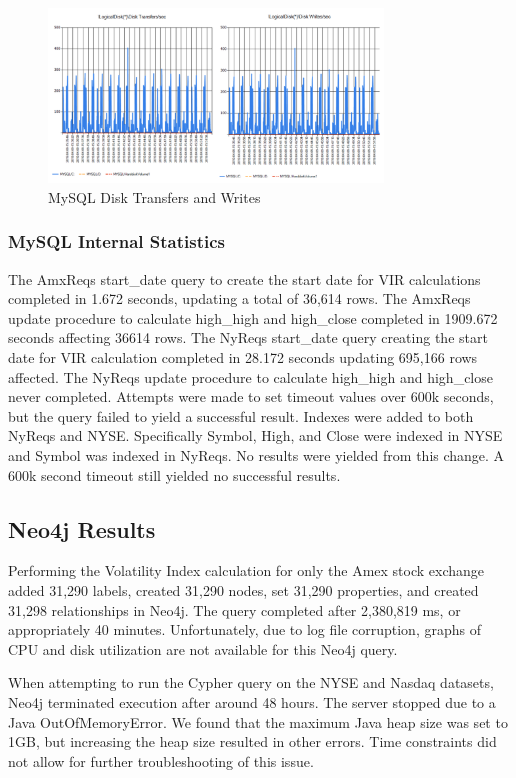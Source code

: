 \documentclass{IEEEtran}
\begin{document}
\begin{figure}
	\centering
	\includegraphics[width=3.5in]{Images/disk_transfer_write.png}
	\caption{MySQL Disk Transfers and Writes}
	\label{fig:disk_transfer_write}
\end{figure}

\subsubsection{MySQL Internal Statistics}

The AmxReqs start\_date query to create the start date for VIR calculations completed in 1.672 seconds, updating a total of 36,614 rows. The AmxReqs update procedure to calculate high\_high and high\_close completed in 1909.672 seconds affecting 36614 rows. The NyReqs start\_date query creating the start date for VIR calculation completed in 28.172 seconds updating 695,166 rows affected. The NyReqs update procedure to calculate high\_high and high\_close never completed. Attempts were made to set timeout values over 600k seconds, but the query failed to yield a successful result. Indexes were added to both NyReqs and NYSE. Specifically Symbol, High, and Close were indexed in NYSE and Symbol was indexed in NyReqs. No results were yielded from this change. A 600k second timeout still yielded no successful results.

\subsection{Neo4j Results}

Performing the Volatility Index calculation for only the Amex stock exchange added 31,290 labels, created 31,290 nodes, set 31,290 properties, and created 31,298 relationships in Neo4j. The query completed after 2,380,819 ms, or appropriately 40 minutes. Unfortunately, due to log file corruption, graphs of CPU and disk utilization are not available for this Neo4j query.  

When attempting to run the Cypher query on the NYSE and Nasdaq datasets, Neo4j terminated execution after around 48 hours. The server stopped due to a Java OutOfMemoryError. We found that the maximum Java heap size was set to 1GB, but increasing the heap size resulted in other errors. Time constraints did not allow for further troubleshooting of this issue.  
\end{document}
